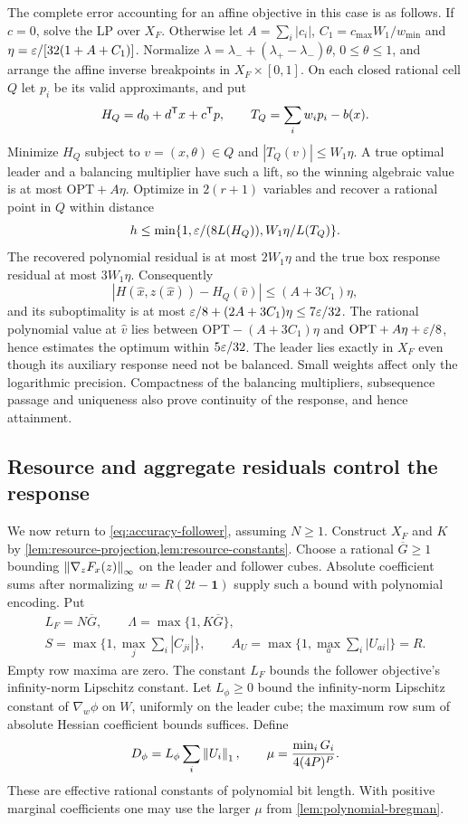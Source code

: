 The complete error accounting for an affine objective in this case is as
follows. If $c=0$, solve the LP over $X_F$. Otherwise let
$A=\sum_i|c_i|$, $C_1=c_{\max}W_1/w_{\min}$ and
$\eta=\varepsilon/[32(1+A+C_1)]$. Normalize
$\lambda=\lambda_-+(\lambda_+-\lambda_-)\theta$,
$0\le\theta\le1$, and arrange the affine inverse breakpoints in
$X_F\times[0,1]$. On each closed rational cell $Q$ let $p_i$ be its
valid approximants, and put
\[
 H_Q=d_0+d^{\mathsf T} x+c^{\mathsf T} p,\qquad T_Q=\sum_iw_ip_i-b(x).
\]
Minimize $H_Q$ subject to $v=(x,\theta)\in Q$ and
$|T_Q(v)|\le W_1\eta$. A true optimal leader and a balancing multiplier
have such a lift, so the winning algebraic value is at most
$\mathrm{OPT}+A\eta$. Optimize in $2(r+1)$ variables and recover a
rational point in $Q$ within distance
\[
 h\le\min\{1,\varepsilon/(8L(H_Q)),W_1\eta/L(T_Q)\}.
\]
The recovered polynomial residual is at most $2W_1\eta$ and the
true box response residual at most $3W_1\eta$. Consequently
\[
 |H(\widehat x,z(\widehat x))-H_Q(\widehat v)|
      \le(A+3C_1)\eta,
\]
and its suboptimality is at most
$\varepsilon/8+(2A+3C_1)\eta\le7\varepsilon/32$. The rational polynomial value
at $\widehat v$ lies between
$\mathrm{OPT}-(A+3C_1)\eta$ and
$\mathrm{OPT}+A\eta+\varepsilon/8$, hence estimates the optimum within
$5\varepsilon/32$. The leader lies exactly in $X_F$ even though its auxiliary
response need not be balanced. Small weights affect only the logarithmic
precision. Compactness of the balancing multipliers, subsequence passage
and uniqueness also prove continuity of the response, and hence
attainment.

\subsection{Resource and aggregate residuals control the response}
\label{subsec:accuracy-certificate}

We now return to \eqref{eq:accuracy-follower}, assuming $N\ge1$.
Construct $X_F$ and $K$ by \cref{lem:resource-projection,lem:resource-constants}.
Choose a rational $\overline G\ge1$ bounding
$\left\lVert\nabla_zF_x(z)\right\rVert_\infty$ on the leader and follower cubes.
Absolute coefficient sums after normalizing $w=R(2t-\mathbf1)$
supply such a bound with polynomial encoding. Put
\[
 \begin{gathered}
 L_F=N\overline G,\qquad \Lambda=\max\{1,K\overline G\},\\
 S=\max\{1,\max_j\sum_i|C_{ji}|\},\qquad
 A_U=\max\{1,\max_a\sum_i|U_{ai}|\}=R.
 \end{gathered}
\]
Empty row maxima are zero. The constant $L_F$ bounds the follower
objective's infinity-norm Lipschitz constant. Let $L_\phi\ge0$ bound
the infinity-norm Lipschitz constant of $\nabla_w\phi$ on $W$,
uniformly on the leader cube; the maximum row sum of absolute Hessian
coefficient bounds suffices. Define
\[
 D_\phi=L_\phi\sum_i\left\lVert U_i\right\rVert_1,\qquad
                        \mu=\frac{\min_iG_i}{4(4P)^P}.
\]
These are effective rational constants of polynomial bit length. With
positive marginal coefficients one may use the larger $\mu$ from
\cref{lem:polynomial-bregman}.

